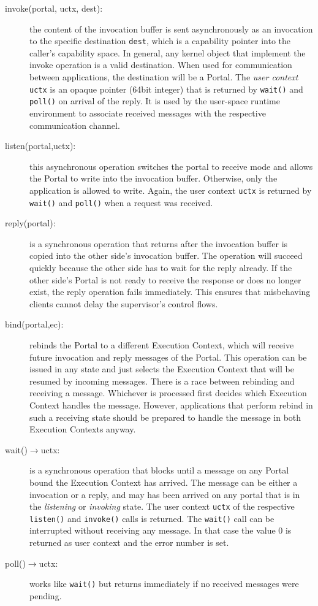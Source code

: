 \begin{description}
\item[invoke(portal, uctx, dest):] the content of the invocation buffer is sent asynchronously as an invocation to the specific destination \texttt{dest}, which is a capability pointer into the caller's capability space. In general, any kernel object that implement the invoke operation is a valid destination. When used for communication between applications, the destination will be a Portal. The \emph{user context} \texttt{uctx} is an opaque pointer (64bit integer) that is returned by \texttt{wait()} and \texttt{poll()} on arrival of the reply. It is used by the user-space runtime environment to associate received messages with the respective communication channel.
 
\item[listen(portal,uctx):] this asynchronous operation switches the portal to receive mode and allows the Portal to write into the invocation buffer. Otherwise, only the application is allowed to write. Again, the user context \texttt{uctx} is returned by \texttt{wait()} and \texttt{poll()} when a request was received.

\item[reply(portal):] is a synchronous operation that returns after the invocation buffer is copied into the other side's invocation buffer. The operation will succeed quickly because the other side has to wait for the reply already. If the other side's Portal is not ready to receive the response or does no longer exist, the reply operation fails immediately. This ensures that misbehaving clients cannot delay the supervisor's control flows.

\item[bind(portal,ec):] rebinds the Portal to a different Execution Context, which will receive future invocation and reply messages of the Portal. This operation can be issued in any state and just selects the Execution Context that will be resumed by incoming messages. There is a race between rebinding and receiving a message. Whichever is processed first decides which Execution Context handles the message. However, applications that perform rebind in such a receiving state should be prepared to handle the message in both Execution Contexts anyway.   

\item[wait()$\rightarrow$uctx:] is a synchronous operation that blocks until a message on any Portal bound the Execution Context has arrived. The message can be either a invocation or a reply, and may has been arrived on any portal that is in the \emph{listening} or \emph{invoking} state. The user context \texttt{uctx} of the respective \texttt{listen()} and \texttt{invoke()} calls is returned. The \texttt{wait()} call can be interrupted without receiving any message. In that case the value 0 is returned as user context and the error number is set.

\item[poll()$\rightarrow$uctx:] works like \texttt{wait()} but returns immediately if no received messages were pending.
\end{description}

